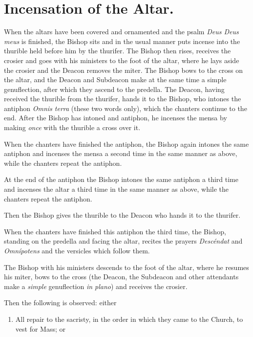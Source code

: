 \documentclass[letterpaper]{report}
\begin{document}
{\section{Incensation of the Altar.}

\rubric When the altars have been covered and ornamented and the psalm
\textit{Deus Deus meus} is finished, the Bishop sits and in the usual manner
puts incense into the thurible held before him by the thurifer. The Bishop then
rises, receives the crosier and goes with his ministers to the foot of the
altar, where he lays aside the crosier and the Deacon removes the miter. The
Bishop bows to the cross on the altar, and the Deacon and Subdeacon make at the
same time a simple genuflection, after which they ascend to the predella. The
Deacon, having received the thurible from the thurifer, hands it to the Bishop,
who intones the antiphon \textit{Omnis terra} (these two words only), which the
chanters continue to the end. After the Bishop has intoned and antiphon, he
incenses the mensa by making \textit{once} with the thurible a cross over it.

\rubric When the chanters have finished the antiphon, the Bishop again intones
the same antiphon and incenses the mensa a second time in the same manner as
above, while the chanters repeat the antiphon.

\rubric At the end of the antiphon the Bishop intones the same antiphon a third
time and incenses the altar a third time in the same manner as above, while the
chanters repeat the antiphon.

Then the Bishop gives the thurible to the Deacon who hands it to the thurifer.

\rubric When the chanters have finished this antiphon the third time, the
Bishop, standing on the predella and facing the altar, recites the prayers
\textit{Descéndat} and \textit{Omnípotens} and the versicles which follow them.

\rubric The Bishop with his ministers descends to the foot of the altar, where
he resumes his miter, bows to the cross (the Deacon, the Subdeacon and other
attendants make a \textit{simple} genuflection \textit{in plano}) and receives
the crosier.

Then the following is observed: either

\begin{enumerate}

    \item All repair to the sacristy, in the order in which they came to the
        Church, to vest for Mass; or


\end{enumerate}}
\end{document}
